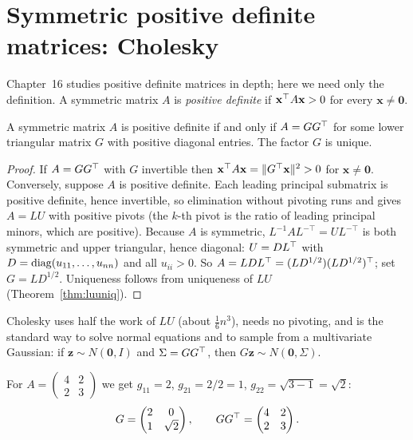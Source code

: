 \section{Symmetric positive definite matrices: Cholesky}

Chapter~16 studies positive definite matrices in depth; here we need only the definition. A symmetric matrix $A$ is \emph{positive definite} if $\mathbf{x}^{\top} A\mathbf{x}>0$ for every $\mathbf{x}\ne\mathbf{0}$.

\begin{theorem}\label{thm:chol}
A symmetric matrix $A$ is positive definite if and only if $A=GG^{\top}$ for some lower triangular matrix $G$ with positive diagonal entries. The factor $G$ is unique.
\end{theorem}

\begin{proof}
If $A=GG^{\top}$ with $G$ invertible then $\mathbf{x}^{\top} A\mathbf{x}=\lVert G^{\top}\mathbf{x}\rVert^2>0$ for $\mathbf{x}\ne\mathbf{0}$. Conversely, suppose $A$ is positive definite. Each leading principal submatrix is positive definite, hence invertible, so elimination without pivoting runs and gives $A=LU$ with positive pivots (the $k$-th pivot is the ratio of leading principal minors, which are positive). Because $A$ is symmetric, $L^{-1}AL^{-\top}=UL^{-\top}$ is both symmetric and upper triangular, hence diagonal: $U=DL^{\top}$ with $D=\operatorname{diag}(u_{11},\dots,u_{nn})$ and all $u_{ii}>0$. So $A=LDL^{\top}=(LD^{1/2})(LD^{1/2})^{\top}$; set $G=LD^{1/2}$. Uniqueness follows from uniqueness of $LU$ (Theorem~\ref{thm:luuniq}).
\end{proof}

Cholesky uses half the work of $LU$ (about $\tfrac16n^3$), needs no pivoting, and is the standard way to solve normal equations and to sample from a multivariate Gaussian: if $\mathbf{z}\sim N(\mathbf{0},I)$ and $\Sigma=GG^{\top}$, then $G\mathbf{z}\sim N(\mathbf{0},\Sigma)$.

\begin{example}
For $A=\begin{pmatrix}4&2\\2&3\end{pmatrix}$ we get $g_{11}=2$, $g_{21}=2/2=1$, $g_{22}=\sqrt{3-1}=\sqrt2$:
\[ G=\begin{pmatrix}2&0\\1&\sqrt2\end{pmatrix},\qquad GG^{\top}=\begin{pmatrix}4&2\\2&3\end{pmatrix}. \]
\end{example}

